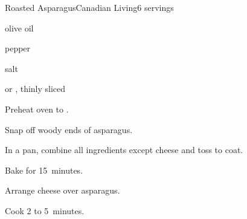 \begin{recipe}{Roasted Asparagus}{Canadian Living}{6 servings}

\begin{ingredients}
\item {} 
\item {} olive oil
\item \tp{\half} pepper
\item \tp{\quarter} salt
\item {}  or , thinly sliced
\end{ingredients}

\begin{directions}
\item Preheat oven to .
\item Snap off woody ends of asparagus.
\item In a pan, combine all ingredients except cheese and toss to coat.
\item Bake for 15~minutes.
\item Arrange cheese over asparagus.
\item Cook 2 to 5~minutes.
\end{directions}

\end{recipe}
